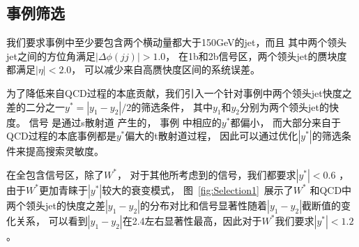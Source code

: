 \subsection{事例筛选}
\label{sec:DijetSelection2}

我们要求事例中至少要包含两个横动量都大于150GeV的jet，而且
其中两个领头jet之间的方位角满足$|\Delta \phi(jj)|>1.0$，
在1b和2b信号区，两个领头jet的赝块度
都满足$|\eta|<2.0$，
可以减少来自高赝快度区间的系统误差。

为了降低来自QCD过程的本底贡献，我们引入一个针对事例中两个领头jet快度之差的二分之一$y^*=|y_1-y_2|/2$的筛选条件，
其中$y_1$和$y_2$分别为两个领头jet的快度。
信号
是通过s散射道%
产生的，
事例
中相应的$y^*$都偏小，
而大部分来自于QCD过程的本底事例都是$y^*$偏大的t散射道过程，
因此可以通过优化$|y^*|$的筛选条件来提高搜索灵敏度。

在全包含信号区，除了$W^*$，
对于其他所考虑到的信号，我们都要求$|y^*|<0.6$ ，
由于$W^*$更加青睐于$|y^*|$较大的衰变模式，
图~\ref{fig:Selection1}~展示了$W^*$
和QCD中两个领头jet的快度之差$|y_1-y_2|$的分布对比和信号显著性随着$|y_1-y_2|$截断值的变化关系，
可以看到$|y_1-y_2|$在2.4左右显著性最高，因此对于$W^*$我们要求$|y^*|<1.2$。

